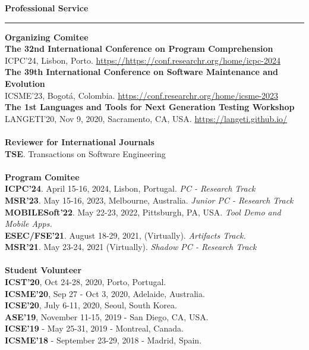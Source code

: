 \documentclass[letterpaper,11pt,oneside]{article}
\begin{document}
\noindent \LARGE{\textbf{Professional Service}} \\
\vspace{-2ex}
\hrule 
\normalsize
\vspace{2ex}
\noindent \large{\textbf{Organizing Comitee}}\\
\indent\textbf{The 32nd International Conference on Program Comprehension}\\
\indent ICPC'24, Lisbon, Porto. \href{https://https://conf.researchr.org/home/icpc-2024}{https://https://conf.researchr.org/home/icpc-2024} \\
\indent\textbf{The 39th International Conference on Software Maintenance and Evolution}\\
\indent ICSME'23, Bogot\'a, Colombia. \href{https://conf.researchr.org/home/icsme-2023}{https://conf.researchr.org/home/icsme-2023} \\
\indent\textbf{The 1st Languages and Tools for Next Generation Testing Workshop} \\
\indent LANGETI'20, Nov 9, 2020, Sacramento, CA, USA. \href{https://langeti.github.io/}{https://langeti.github.io/} \\
\\
\noindent \large{\textbf{Reviewer for International Journals}}\\
\indent \textbf{TSE}. Transactions on Software Engineering \\
\\
\noindent \large{\textbf{Program Comitee}} \\
\indent \textbf{ICPC'24}. April 15-16, 2024, Lisbon, Portugal. \textit{PC - Research Track} \\
\indent \textbf{MSR'23}. May 15-16, 2023, Melbourne, Australia. \textit{Junior PC - Research Track} \\
\indent \textbf{MOBILESoft'22}. May 22-23, 2022, Pittsburgh, PA, USA. \textit{Tool Demo and Mobile Apps.} \\
\indent \textbf{ESEC/FSE'21}. August 18-29, 2021, (Virtually). \textit{Artifacts Track.} \\
\indent \textbf{MSR'21}. May 23-24, 2021 (Virtually). \textit{Shadow PC - Research Track} \\
\\
\noindent \large{\textbf{Student Volunteer}} \\
\indent \textbf{ICST'20}, Oct 24-28, 2020, Porto, Portugal. \\
\indent \textbf{ICSME'20}, Sep 27 - Oct 3, 2020, Adelaide, Australia. \\
\indent \textbf{ICSE'20}, July 6-11, 2020, Seoul, South Korea. \\
\indent \textbf{ASE'19}, November 11-15, 2019 - San Diego, CA, USA. \\
\indent \textbf{ICSE'19} - May 25-31, 2019 - Montreal, Canada. \\
\indent \textbf{ICSME'18} - September 23-29, 2018 - Madrid, Spain. \\\\
\end{document}
